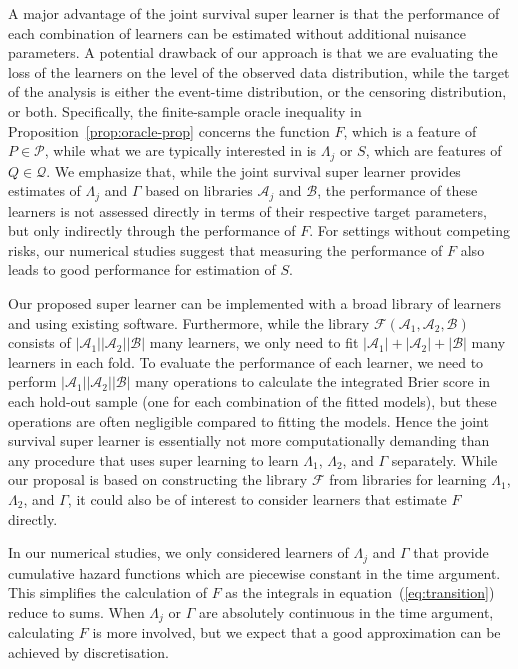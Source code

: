 \documentclass[lineno]{biometrika}
\newcommand{\1}{\mathds{1}}
\begin{document}
A major advantage of the joint survival super learner is that the
performance of each combination of learners can be estimated without
additional nuisance parameters. A potential drawback of our approach
is that we are evaluating the loss of the learners on the level of the
observed data distribution, while the target of the analysis is either
the event-time distribution, or the censoring distribution, or both.
Specifically, the finite-sample oracle inequality in
Proposition~\ref{prop:oracle-prop} concerns the function \( F \),
which is a feature of \( P \in \mathcal{P} \), while what we are
typically interested in is \( \Lambda_j \) or \( S \), which are
features of \( Q \in \mathcal{Q} \). We emphasize that, while the
joint survival super learner provides estimates of \( \Lambda_j \) and
$\Gamma$ based on libraries \( \mathcal{A}_j \) and \( \mathcal{B} \),
the performance of these learners is not assessed directly in terms of
their respective target parameters, but only indirectly through the
performance of \( F \). For settings without competing risks, our
numerical studies suggest that measuring the performance of \( F \)
also leads to good performance for estimation of \( S \).

Our proposed super learner can be implemented with a broad library of
learners and using existing software. Furthermore, while the library
\( \mathcal{F}(\mathcal{A}_1,\mathcal{A}_2,\mathcal{B}) \) consists of
\( |\mathcal{A}_1||\mathcal{A}_2||\mathcal{B}| \) many learners, we
only need to fit
\( |\mathcal{A}_1| +|\mathcal{A}_2| + |\mathcal{B}| \) many learners
in each fold. To evaluate the performance of each learner, we need to
perform \( |\mathcal{A}_1||\mathcal{A}_2||\mathcal{B}| \) many
operations to calculate the integrated Brier score in each hold-out
sample (one for each combination of the fitted models), but these
operations are often negligible compared to fitting the models. Hence
the joint survival super learner is essentially not more
computationally demanding than any procedure that uses super learning
to learn $\Lambda_1$, $\Lambda_2$, and $\Gamma$ separately. While our
proposal is based on constructing the library \( \mathcal{F} \) from
libraries for learning \( \Lambda_1 \), $\Lambda_2$, and $\Gamma$, it
could also be of interest to consider learners that estimate \( F \)
directly.

In our numerical studies, we only considered learners of $\Lambda_j$ and
$\Gamma$ that provide cumulative hazard functions which are piecewise constant
in the time argument. This simplifies the calculation of \( F \) as the
integrals in equation~(\ref{eq:transition}) reduce to sums. When $\Lambda_j$ or
\( \Gamma \) are absolutely continuous in the time argument, calculating \( F \)
is more involved, but we expect that a good approximation can be achieved by
discretisation.
\end{document}
